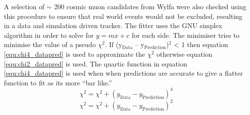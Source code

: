 A selection of $\sim$ 200 cosmic muon candidates from Wylfa were also checked using this procedure to ensure that real world events would not be excluded, resulting in a data and simulation driven tracker. The fitter uses the GNU simplex algorithm \cite{galassi2002gnu} in order to solve for $y = mx + c$ for each side. The minimiser tries to minimise the value of a pseudo $\chi^2$. If (y$_\textrm{{Data}}$ -- y$_\textrm{{Prediction}}$)$^2$ < 1 then equation \ref{equ:chi4_datapred} is used to approximate the $\chi^2$ otherwise equation \ref{equ:chi2_datapred} is used. The quartic function in equation \ref{equ:chi4_datapred} is used when when predictions are accurate to give a flatter function to fit as its more ``bar like.'' 
\begin{equation}
    \chi^2 = \chi^2 + (y_\textrm{{Data}} - y_\textrm{{Prediction}})^4
    \label{equ:chi4_datapred}
\end{equation}
\begin{equation}
    \chi^2 = \chi^2 + (y_\textrm{{Data}} - y_\textrm{{Prediction}})^2
    \label{equ:chi2_datapred}
\end{equation}

